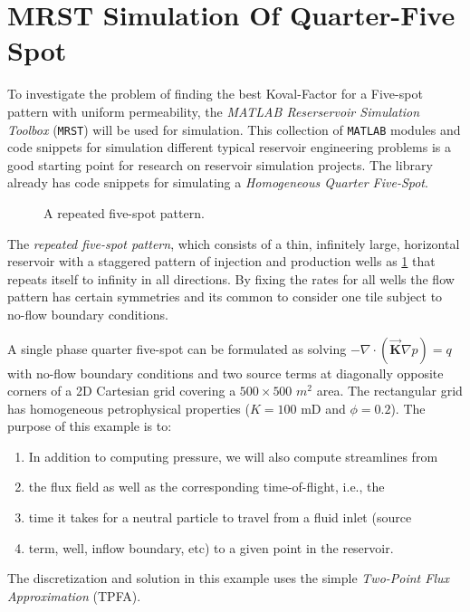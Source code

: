 \documentclass[barcolor=BrickRed,nocopyright,nolists]{asmejour}
\begin{document}
\section{MRST Simulation Of Quarter-Five Spot}
To investigate the problem of finding the best Koval-Factor for a Five-spot pattern with uniform permeability, 
the \textit{MATLAB Reserservoir Simulation Toolbox} (\texttt{MRST}) will be used for simulation. This collection
of \texttt{MATLAB} modules and code snippets for simulation different typical reservoir engineering problems is 
a good starting point for research on reservoir simulation projects. The library already has code snippets for
simulating a \textit{Homogeneous Quarter Five-Spot}\cite{mrst}.
\begin{figure}[h]
	\centering\scalebox{0.8}{}
	\caption{A repeated five-spot pattern.}
	\label{fivespot}
\end{figure}
The \textit{repeated five-spot pattern}, which consists of a thin, infinitely large, horizontal reservoir with a staggered
pattern of injection and production wells as \ref{fivespot} that repeats itself to infinity in all directions. By fixing the 
rates for all wells the flow pattern has certain symmetries and its common to consider one tile subject to no-flow boundary
conditions.

A single phase quarter five-spot can be formulated as solving $-\nabla \cdot (\mathbf{\vec{K}}\nabla p) = q$ with no-flow boundary
conditions and two source terms at diagonally opposite corners of a 2D Cartesian grid covering a $500\times500$ $m^{2}$ area.
The rectangular grid has homogeneous petrophysical properties ($K= 100$ mD and $\phi = 0.2$). The purpose of this example is to:

\begin{enumerate}
	\item In addition to computing pressure, we will also compute streamlines from
	\item the flux field as well as the corresponding time-of-flight, i.e., the
	\item time it takes for a neutral particle to travel from a fluid inlet (source
	\item term, well, inflow boundary, etc) to a given point in the reservoir.
\end{enumerate}

The discretization and solution in this example uses the simple \textit{Two-Point Flux Approximation} (TPFA).
\end{document}

